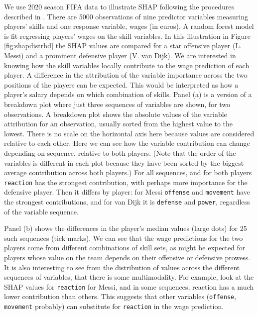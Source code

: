 \documentclass[
]{jss}
\begin{document}
We use 2020 season FIFA data \citep{leone_fifa_2020} to illustrate SHAP
following the procedures described in \citet{biecek_explanatory_2021}.
There are 5000 observations of nine predictor variables measuring
players' skills and one response variable, wages (in euros). A random
forest model is fit regressing players' wages on the skill variables. In
this illustration in Figure \ref{fig:shapdistrbd} the SHAP values are
compared for a star offensive player (L. Messi) and a prominent
defensive player (V. van Dijk). We are interested in knowing how the
skill variables locally contribute to the wage prediction of each
player. A difference in the attribution of the variable importance
across the two positions of the players can be expected. This would be
interpreted as how a player's salary depends on which combination of
skills. Panel (a) is a version of a breakdown plot
\citep{gosiewska_ibreakdown_2019} where just three sequences of
variables are shown, for two observations. A breakdown plot shows the
absolute values of the variable attribution for an observation, usually
sorted from the highest value to the lowest. There is no scale on the
horizontal axis here because values are considered relative to each
other. Here we can see how the variable contribution can change
depending on sequence, relative to both players. (Note that the order of
the variables is different in each plot because they have been sorted by
the biggest average contribution across both players.) For all
sequences, and for both players \texttt{reaction} has the strongest
contribution, with perhaps more importance for the defensive player.
Then it differs by player: for Messi \texttt{offense} and
\texttt{movement} have the strongest contributions, and for van Dijk it
is \texttt{defense} and \texttt{power}, regardless of the variable
sequence.

Panel (b) shows the differences in the player's median values (large
dots) for 25 such sequences (tick marks). We can see that the wage
predictions for the two players come from different combinations of
skill sets, as might be expected for players whose value on the team
depends on their offensive or defensive prowess. It is also interesting
to see from the distribution of values across the different sequences of
variables, that there is some multimodality. For example, look at the
SHAP values for \texttt{reaction} for Messi, and in some sequences,
reaction has a much lower contribution than others. This suggests that
other variables (\texttt{offense}, \texttt{movement} probably) can
substitute for \texttt{reaction} in the wage prediction.
\end{document}
